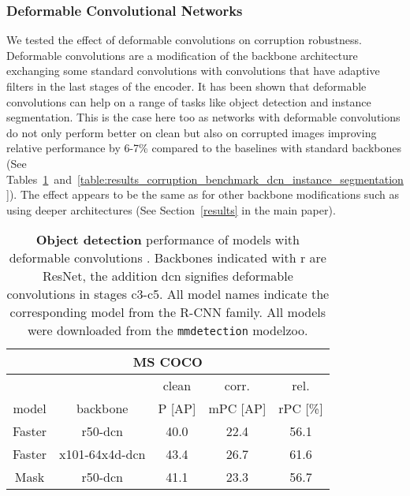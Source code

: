 \documentclass{article}
\begin{document}
\subsubsection{Deformable Convolutional Networks}

We tested the effect of deformable convolutions \citep{dai2017deformable, zhu2018deformable} on corruption robustness. Deformable convolutions are a modification of the backbone architecture exchanging some standard convolutions with convolutions that have adaptive filters in the last stages of the encoder. It has been shown that deformable convolutions can help on a range of tasks like object detection and instance segmentation. This is the case here too as networks with deformable convolutions do not only perform better on clean but also on corrupted images improving relative performance by 6-7\% compared to the baselines with standard backbones (See Tables~\ref{table:results_corruption_benchmark_dcn}~and~\ref{table:results_corruption_benchmark_dcn_instance_segmentation}). The effect appears to be the same as for other backbone modifications such as using deeper architectures (See Section~\ref{results} in the main paper).

\begin{table}[t!]
\begin{center}
\begin{tabular}{c|c|ccc}
\multicolumn{5}{c}{MS COCO} \\
\toprule
\multicolumn{2}{c}{} & clean & corr. & rel.\\
model & backbone & P \small{[AP]} & mPC \small{[AP]} & rPC \small{[\%]}\\
\hline
Faster & r50-dcn & 40.0 & 22.4 & 56.1\\
Faster & x101-64x4d-dcn & 43.4 & 26.7 & 61.6\\
Mask & r50-dcn & 41.1 & 23.3 & 56.7\\
\bottomrule
\end{tabular}
\caption{\textbf{Object detection} performance of models with deformable convolutions \cite{dai2017deformable}. Backbones indicated with r are ResNet, the addition dcn signifies deformable convolutions in stages c3-c5. All model names indicate the corresponding model from the R-CNN family. All models were downloaded from the \texttt{mmdetection} modelzoo.}
\label{table:results_corruption_benchmark_dcn}
\end{center}
\end{table}
\end{document}
